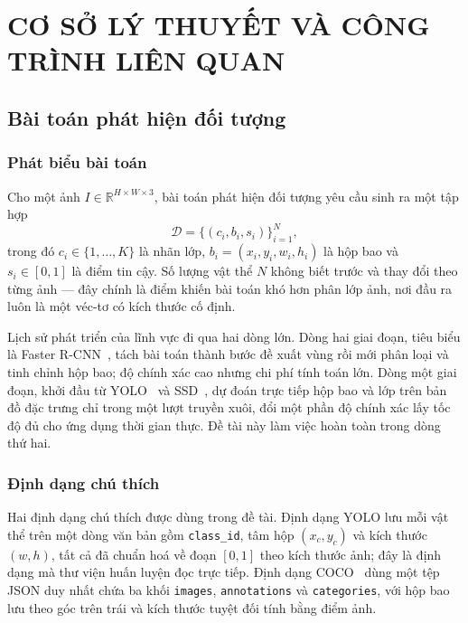 \chapter{CƠ SỞ LÝ THUYẾT VÀ CÔNG TRÌNH LIÊN QUAN}
\label{ch:co_so}

\section{Bài toán phát hiện đối tượng}

\subsection{Phát biểu bài toán}

Cho một ảnh $I \in \mathbb{R}^{H \times W \times 3}$, bài toán phát hiện đối tượng yêu cầu sinh ra
một tập hợp
\begin{equation}
\label{eq:phatbieu}
\mathcal{D} = \{(c_i, b_i, s_i)\}_{i=1}^{N},
\end{equation}
trong đó $c_i \in \{1,\dots,K\}$ là nhãn lớp, $b_i = (x_i, y_i, w_i, h_i)$ là hộp bao và
$s_i \in [0,1]$ là điểm tin cậy. Số lượng vật thể $N$ không biết trước và thay đổi theo từng ảnh
--- đây chính là điểm khiến bài toán khó hơn phân lớp ảnh, nơi đầu ra luôn là một véc-tơ có kích
thước cố định.

Lịch sử phát triển của lĩnh vực đi qua hai dòng lớn. Dòng hai giai đoạn, tiêu biểu là Faster
R-CNN~\cite{ren2017fasterrcnn}, tách bài toán thành bước đề xuất vùng rồi mới phân loại và tinh
chỉnh hộp bao; độ chính xác cao nhưng chi phí tính toán lớn. Dòng một giai đoạn, khởi đầu từ
YOLO~\cite{redmon2016yolo} và SSD~\cite{liu2016ssd}, dự đoán trực tiếp hộp bao và lớp trên bản đồ
đặc trưng chỉ trong một lượt truyền xuôi, đổi một phần độ chính xác lấy tốc độ đủ cho ứng dụng thời
gian thực. Đề tài này làm việc hoàn toàn trong dòng thứ hai.

\subsection{Định dạng chú thích}

Hai định dạng chú thích được dùng trong đề tài. Định dạng YOLO lưu mỗi vật thể trên một dòng văn
bản gồm \texttt{class\_id}, tâm hộp $(x_c, y_c)$ và kích thước $(w, h)$, tất cả đã chuẩn hoá về
đoạn $[0,1]$ theo kích thước ảnh; đây là định dạng mà thư viện huấn luyện đọc trực tiếp. Định dạng
COCO~\cite{lin2014coco} dùng một tệp JSON duy nhất chứa ba khối \texttt{images},
\texttt{annotations} và \texttt{categories}, với hộp bao lưu theo góc trên trái và kích thước tuyệt
đối tính bằng điểm ảnh.

